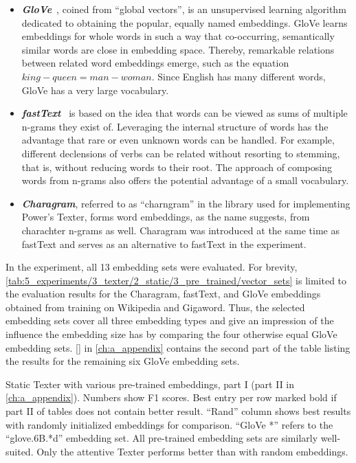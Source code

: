 \begin{itemize}
    \item \textbf{\emph{GloVe}}~\cite{Pennington2014GloveGV}, coined from ``global vectors'', is an unsupervised learning algorithm dedicated to obtaining the popular, equally named embeddings. GloVe learns embeddings for whole words in such a way that co-occurring, semantically similar words are close in embedding space. Thereby, remarkable relations between related word embeddings emerge, such as the equation $king - queen = man - woman$. Since English has many different words, GloVe has a very large vocabulary.

    \item \textbf{\emph{fastText}}~\cite{Bojanowski2017EnrichingWV,Mikolov2018AdvancesIP}  is based on the idea that words can be viewed as sums of multiple n-grams they exist of. Leveraging the internal structure of words has the advantage that rare or even unknown words can be handled. For example, different declensions of verbs can be related without resorting to stemming, that is, without reducing words to their root. The approach of composing words from n-grams also offers the potential advantage of a small vocabulary.

    \item \textbf{\emph{Charagram}}, referred to as ``charngram'' in the library used for implementing Power's Texter, forms word embeddings, as the name suggests, from charachter n-grams as well. Charagram was introduced at the same time as fastText and serves as an alternative to fastText in the experiment.
\end{itemize}

In the experiment, all 13 embedding sets were evaluated. For brevity, \autoref{tab:5_experiments/3_texter/2_static/3_pre_trained/vector_sets} is limited to the evaluation results for the Charagram, fastText, and GloVe embeddings obtained from training on Wikipedia and Gigaword. Thus, the selected embedding sets cover all three embedding types and give an impression of the influence the embedding size has by comparing the four otherwise equal GloVe embedding sets. \autoref{} in \autoref{ch:a_appendix} contains the second part of the table listing the results for the remaining six GloVe embedding sets.

\begin{table}[t!]
    \makebox[\textwidth][c]{
        
    }
    \caption{Static Texter with various pre-trained embeddings, part I (part II in \autoref{ch:a_appendix}). Numbers show F1 scores. Best entry per row marked bold if part II of tables does not contain better result. ``Rand'' column shows best results with randomly initialized embeddings for comparison. ``GloVe *'' refers to the ``glove.6B.*d'' embedding set. All pre-trained embedding sets are similarly well-suited. Only the attentive Texter performs better than with random embeddings.}
    \label{tab:5_experiments/3_texter/2_static/3_pre_trained/grid_search}
\end{table}

